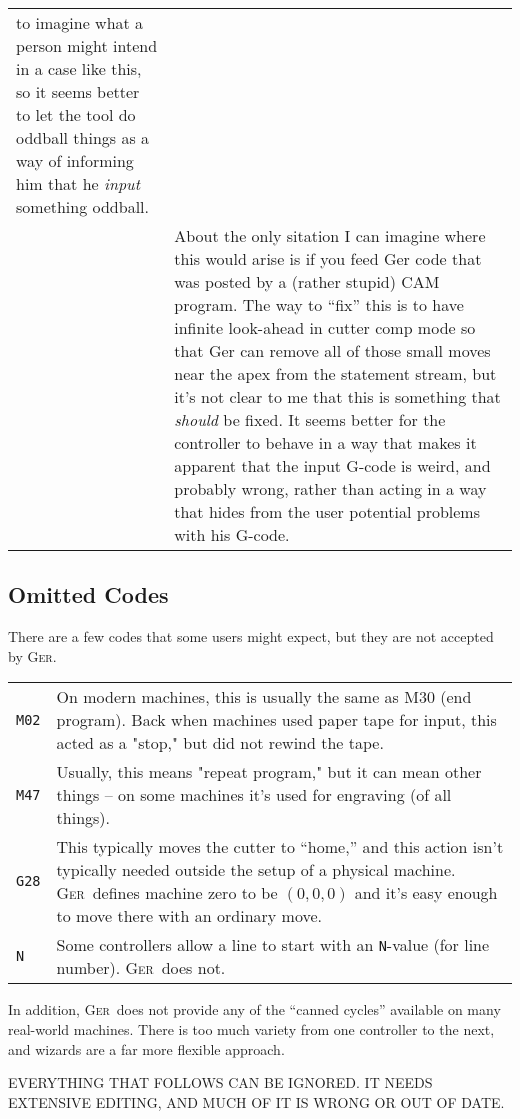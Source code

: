 \documentclass[titlepage,oneside,10pt]{article}
\newcommand{\ger}{\textsc{Ger}}
\begin{document}
\begin{longtable}{lp{10cm}}
to imagine what a person might intend in a case like this, so it seems
better to let the tool do oddball things as a way of informing him
that he \emph{input} something oddball. \\
& About the only sitation I
can imagine where this would arise is if you feed Ger code that was
posted by a (rather stupid) CAM program. The way to ``fix'' this is to
have infinite look-ahead in cutter comp mode so that Ger can remove
all of those small moves near the apex from the statement stream, but
it's not clear to me that this is something that \emph{should} be
fixed. It seems better for the controller to behave in a way that
makes it apparent that the input G-code is weird, and probably wrong, rather
than acting in a way that hides from the user potential problems with his
G-code. \\
\end{longtable}
\vskip 0.50cm

\subsection{Omitted Codes}

There are a few codes that some users might expect, but they are not
accepted by \ger.

\vskip 0.25cm
\begin{longtable}{lp{10cm}}
{\tt M02}& On modern machines, this is usually the same as M30
(end program). Back when machines used paper tape for input, this
acted as a "stop," but did not rewind the tape.\\
{\tt M47}& Usually, this means "repeat program," but it can mean other
things -- on some machines it's used for engraving (of all things).\\
{\tt G28}& This typically moves the cutter to ``home,'' and this
action isn't typically needed outside the setup of a physical
machine. \ger\ defines machine zero to be $(0,0,0)$ and 
it's easy enough to move there with an ordinary move.\\
{\tt N} & Some controllers allow a line to start with an {\tt N}-value
(for line number). \ger\ does not.
\end{longtable}

In addition, \ger\ does not provide any of the ``canned cycles''
available on many real-world machines. There is too much variety from
one controller to the next, and wizards are a far more flexible
approach.

\pagebreak

EVERYTHING THAT FOLLOWS CAN BE IGNORED. IT NEEDS EXTENSIVE EDITING,
AND MUCH OF IT IS WRONG OR OUT OF DATE.
\end{document}
